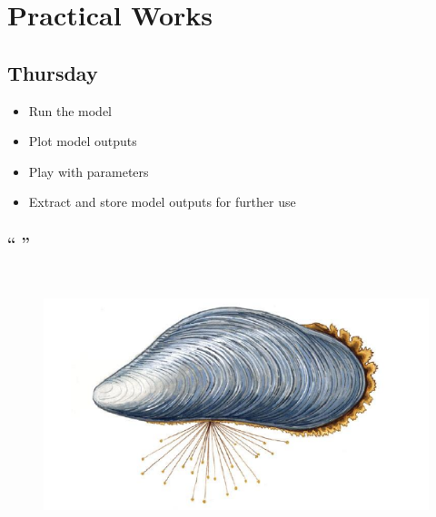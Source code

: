 \documentclass[final,xcolor=dvipsnames]{beamer}
\begin{document}
      
      
      \section{Practical Works}
      \subsection{Thursday}
\begin{frame}      
 \begin{itemize}
  \item Run the model
  \item Plot model outputs
  \item Play with parameters
  \item Extract and store model outputs for further use
 \end{itemize}

\end{frame}


\begin{frame}
  \frametitle{`` ''}
  \center{ \Huge \textcolor{NavyBlue}{That's all Folks ! }} \\
  \begin{figure}
   \includegraphics[width=.6\framewidth]{Mussel}
  \end{figure}

\end{frame}

      
    
\end{document}
